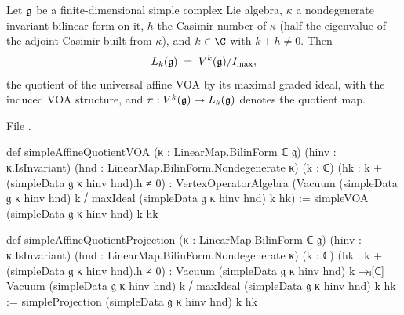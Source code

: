 \begin{definition}\label{l23:def:simpleaffinequotient}
Let $\mathfrak g$ be a finite-dimensional simple complex Lie algebra, $\kappa$ a nondegenerate invariant bilinear form on it, $h$ the
Casimir number of $\kappa$ (half the eigenvalue of the adjoint Casimir built from $\kappa$), and $k\in\C$ with $k+h\ne0$. Then
\begin{equation*}
L_k(\mathfrak g)\;=\;V^k(\mathfrak g)/I_{\max},
\end{equation*}
the quotient of the universal affine VOA by its maximal graded ideal, with the induced VOA structure, and
$\pi:V^k(\mathfrak g)\to L_k(\mathfrak g)$ denotes the quotient map.
\end{definition}
\noindent File .
\begin{leancode}
def simpleAffineQuotientVOA (κ : LinearMap.BilinForm ℂ 𝔤) (hinv : κ.IsInvariant)
    (hnd : LinearMap.BilinForm.Nondegenerate κ) (k : ℂ) (hk : k + (simpleData 𝔤 κ hinv hnd).h ≠ 0) :
    VertexOperatorAlgebra
      (Vacuum (simpleData 𝔤 κ hinv hnd) k ⧸ maxIdeal (simpleData 𝔤 κ hinv hnd) k hk) :=
  simpleVOA (simpleData 𝔤 κ hinv hnd) k hk

def simpleAffineQuotientProjection (κ : LinearMap.BilinForm ℂ 𝔤) (hinv : κ.IsInvariant)
    (hnd : LinearMap.BilinForm.Nondegenerate κ) (k : ℂ) (hk : k + (simpleData 𝔤 κ hinv hnd).h ≠ 0) :
    Vacuum (simpleData 𝔤 κ hinv hnd) k →ₗ[ℂ]
      Vacuum (simpleData 𝔤 κ hinv hnd) k ⧸ maxIdeal (simpleData 𝔤 κ hinv hnd) k hk :=
  simpleProjection (simpleData 𝔤 κ hinv hnd) k hk
\end{leancode}

